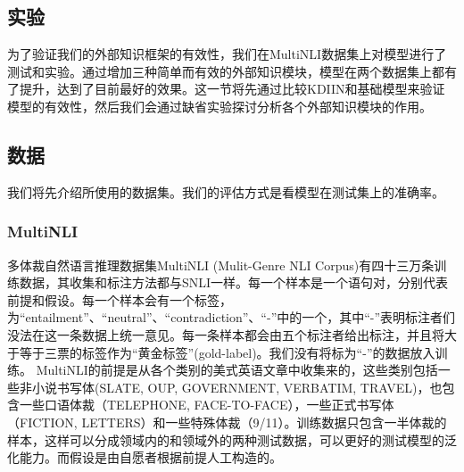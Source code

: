 \documentclass[UTF8,11pt,a4paper,nofonts]{ctexart}
\numberwithin{equation}{section}
\begin{document}

\newpage
\begin{center}
\section{实验}
\end{center}
\par

为了验证我们的外部知识框架的有效性，我们在MultiNLI数据集上对模型进行了测试和实验。通过增加三种简单而有效的外部知识模块，模型在两个数据集上都有了提升，达到了目前最好的效果。这一节将先通过比较KDIIN和基础模型来验证模型的有效性，然后我们会通过缺省实验探讨分析各个外部知识模块的作用。

\subsection{数据}
我们将先介绍所使用的数据集。我们的评估方式是看模型在测试集上的准确率。


\subsubsection{MultiNLI} 多体裁自然语言推理数据集MultiNLI (Mulit-Genre NLI Corpus)\cite{Nangia2017TheR2}有四十三万条训练数据，其收集和标注方法都与SNLI一样。每一个样本是一个语句对，分别代表前提和假设。每一个样本会有一个标签，为“entailment”、“neutral”、“contradiction”、“-”中的一个，其中“-”表明标注者们没法在这一条数据上统一意见。每一条样本都会由五个标注者给出标注，并且将大于等于三票的标签作为“黄金标签”(gold-label)。我们没有将标为“-”的数据放入训练。
MultiNLI的前提是从各个类别的美式英语文章中收集来的，这些类别包括一些非小说书写体(SLATE, OUP, GOVERNMENT, VERBATIM, TRAVEL)，也包含一些口语体裁（TELEPHONE, FACE-TO-FACE），一些正式书写体（FICTION, LETTERS）和一些特殊体裁（9/11）。训练数据只包含一半体裁的样本，这样可以分成领域内的和领域外的两种测试数据，可以更好的测试模型的泛化能力。而假设是由自愿者根据前提人工构造的。
\end{document}

